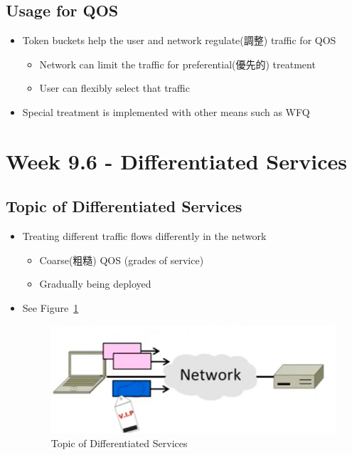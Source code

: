\documentclass[12pt]{ctexart}   %
\begin{document}
	\subsection{Usage for QOS}
	\begin{itemize}
		\item Token buckets help the user and network regulate(調整) traffic for QOS
		\begin{itemize}
			\item Network can limit the traffic for preferential(優先的) treatment
			\item User can flexibly select that traffic
		\end{itemize}
		
		\item Special treatment is implemented with other means such as WFQ
	\end{itemize}

\section{Week 9.6 - Differentiated Services}
	\subsection{Topic of Differentiated Services}
	\begin{itemize}
		\item Treating different traffic flows differently in the network
		\begin{itemize}
			\item Coarse(粗糙) QOS (grades of service)
			\item Gradually being deployed
		\end{itemize}
		\item See Figure~\ref{fig:9-6-1}
		  
		\begin{figure}[h!] %
		\centering
		\includegraphics[scale=0.7]{images/9-6-1}
		\caption{ Topic of Differentiated Services }
		\label{fig:9-6-1}
		\end{figure}
	\end{itemize}
\end{document}

